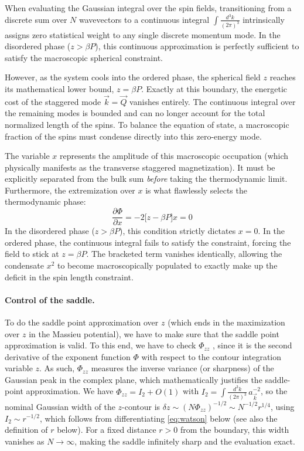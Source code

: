 \documentclass[11pt,a4paper]{article}
\newcommand{\bk}{\vec k}
\newcommand{\bQ}{\vec Q}
\newcommand{\dk}{\frac{d^3k}{(2\pi)^3}}
\newcommand{\bk}{\vec k}
\newcommand{\bQ}{\vec Q}
\newcommand{\dk}{\frac{d^3k}{(2\pi)^3}}
\begin{document}
When evaluating the Gaussian integral over the spin fields, transitioning from a discrete sum over $N$ wavevectors to a continuous integral $\int \dk$ intrinsically assigns zero statistical weight to any single discrete momentum mode. In the disordered phase ($z > \beta P$), this continuous approximation is perfectly sufficient to satisfy the macroscopic spherical constraint.

However, as the system cools into the ordered phase, the spherical field $z$ reaches its mathematical lower bound, $z = \beta P$. Exactly at this boundary, the energetic cost of the staggered mode $\bk = \bQ$ vanishes entirely. The continuous integral over the remaining modes is bounded and can no longer account for the total normalized length of the spins. To balance the equation of state, a macroscopic fraction of the spins must condense directly into this zero-energy mode. 

The variable $x$ represents the amplitude of this macroscopic occupation (which physically manifests as the transverse staggered magnetization). It must be explicitly separated from the bulk sum \emph{before} taking the thermodynamic limit. Furthermore, the extremization over $x$ is what flawlessly selects the thermodynamic phase:
\begin{equation}
  \frac{\partial \Phi}{\partial x} = -2\big[z - \beta P\big]x = 0
\end{equation}
In the disordered phase ($z > \beta P$), this condition strictly dictates $x = 0$. In the ordered phase, the continuous integral fails to satisfy the constraint, forcing the field to stick at $z = \beta P$. The bracketed term vanishes identically, allowing the condensate $x^2$ to become macroscopically populated to exactly make up the deficit in the spin length constraint.

\paragraph{Control of the saddle.} To do the saddle point approximation over $z$ (which ends in the maximization over $z$ in the Massieu potential), we have to make sure that the saddle point approximation is valid. To this end, we have to check $\Phi_{zz}$  , since it is the second derivative of the exponent function $\Phi$ with respect to the contour integration variable $z$. As such, $\Phi_{zz}$ measures the inverse variance (or sharpness) of the Gaussian peak in the complex plane, which mathematically justifies the saddle-point approximation. We have $\Phi_{zz}=I_2+O(1)$ with $I_2=\int\!\dk\,a_{\bk}^{-2}$, so the nominal Gaussian width of the $z$-contour is $\delta z\sim(N\Phi_{zz})^{-1/2}\sim N^{-1/2}r^{1/4}$, using $I_2\sim r^{-1/2}$, which follows from differentiating \eqref{eq:watson} below
(see also the definition of $r$ below). For a fixed distance $r>0$ from the boundary, this width vanishes as $N\to\infty$, making the saddle infinitely sharp and the evaluation exact.
\end{document}
